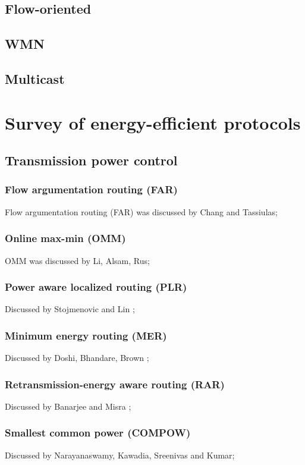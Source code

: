 \documentclass[conference]{IEEEtran}
\begin{document}
\subsection{Flow-oriented}
\subsection{WMN}
\subsection{Multicast}

\section{Survey of energy-efficient protocols}
\subsection{Transmission power control}
\subsubsection{Flow argumentation routing (FAR)}
Flow argumentation routing (FAR) was discussed by Chang and Tassiulas\cite{chang2000energy};
\subsubsection{Online max-min (OMM)}
OMM was discussed by Li, Alsam, Rus\cite{li2001online};
\subsubsection{Power aware localized routing (PLR)}
Discussed by Stojmenovic and Lin \cite{stojmenovic2001power};
\subsubsection{Minimum energy routing (MER)}
Discussed by Doshi, Bhandare, Brown \cite{doshi2002demand};
\subsubsection{Retransmission-energy aware routing (RAR)}
Discussed by Banarjee and Misra \cite{banerjee2002minimum};
\subsubsection{Smallest common power (COMPOW)}
Discussed by Narayanaswamy, Kawadia, Sreenivas and Kumar\cite{narayanaswamy2002power};
\end{document}
